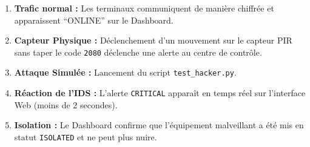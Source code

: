 \documentclass[
]{article}
\providecommand{\tightlist}{%
  \setlength{\itemsep}{0pt}\setlength{\parskip}{0pt}}
\begin{document}
\begin{enumerate}
\def\labelenumi{\arabic{enumi}.}
\tightlist
\item
  \textbf{Trafic normal :} Les terminaux communiquent de manière
  chiffrée et apparaissent ``ONLINE'' sur le Dashboard.
\item
  \textbf{Capteur Physique :} Déclenchement d'un mouvement sur le
  capteur PIR sans taper le code \texttt{2080} déclenche une alerte au
  centre de contrôle.
\item
  \textbf{Attaque Simulée :} Lancement du script
  \texttt{test\_hacker.py}.
\item
  \textbf{Réaction de l'IDS :} L'alerte \texttt{CRITICAL} apparaît en
  temps réel sur l'interface Web (moins de 2 secondes).
\item
  \textbf{Isolation :} Le Dashboard confirme que l'équipement
  malveillant a été mis en statut \texttt{ISOLATED} et ne peut plus
  nuire.
\end{enumerate}
\end{document}
